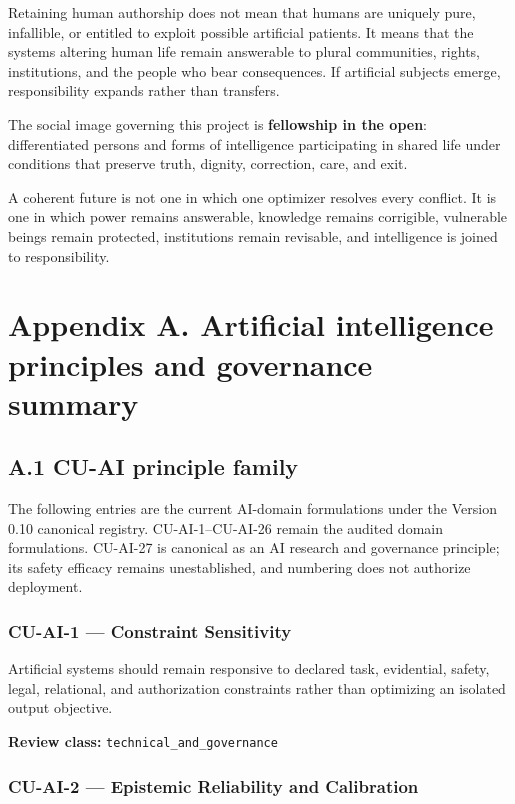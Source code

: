 \documentclass[
  11pt,
]{article}
\begin{document}
Retaining human authorship does not mean that humans are uniquely pure,
infallible, or entitled to exploit possible artificial patients. It
means that the systems altering human life remain answerable to plural
communities, rights, institutions, and the people who bear consequences.
If artificial subjects emerge, responsibility expands rather than
transfers.

The social image governing this project is \textbf{fellowship in the
open}: differentiated persons and forms of intelligence participating in
shared life under conditions that preserve truth, dignity, correction,
care, and exit.

A coherent future is not one in which one optimizer resolves every
conflict. It is one in which power remains answerable, knowledge remains
corrigible, vulnerable beings remain protected, institutions remain
revisable, and intelligence is joined to responsibility.

\section{Appendix A. Artificial intelligence principles and governance
summary}\label{appendix-a.-artificial-intelligence-principles-and-governance-summary}

\subsection{A.1 CU-AI principle
family}\label{a.1-cu-ai-principle-family}

The following entries are the current AI-domain formulations under the
Version 0.10 canonical registry. CU-AI-1--CU-AI-26 remain the audited
domain formulations. CU-AI-27 is canonical as an AI research and
governance principle; its safety efficacy remains unestablished, and
numbering does not authorize deployment.

\subsubsection{CU-AI-1 --- Constraint
Sensitivity}\label{cu-ai-1-constraint-sensitivity}

Artificial systems should remain responsive to declared task,
evidential, safety, legal, relational, and authorization constraints
rather than optimizing an isolated output objective.

\textbf{Review class:} \texttt{technical\_and\_governance}

\subsubsection{CU-AI-2 --- Epistemic Reliability and
Calibration}\label{cu-ai-2-epistemic-reliability-and-calibration}
\end{document}
